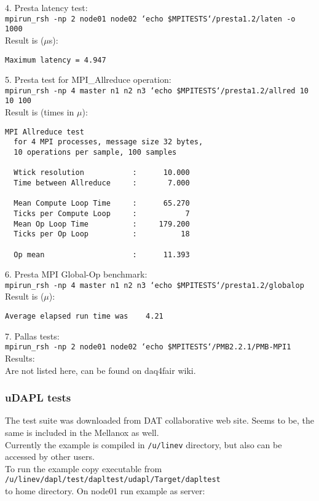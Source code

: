 4. Presta latency test:\\
{\tt mpirun\_rsh -np 2 node01 node02 `echo \$MPITESTS`/presta1.2/laten -o 1000}\\
Result is ($\mu$s):
\begin{verbatim}
Maximum latency = 4.947 
\end{verbatim}

5. Presta test for MPI\_Allreduce operation:\\
{\tt mpirun\_rsh -np 4 master n1 n2 n3 `echo \$MPITESTS`/presta1.2/allred 10 10 100}\\
Result is (times in $\mu$):
\begin{verbatim}
MPI Allreduce test
  for 4 MPI processes, message size 32 bytes, 
  10 operations per sample, 100 samples

  Wtick resolution           :      10.000
  Time between Allreduce     :       7.000

  Mean Compute Loop Time     :      65.270
  Ticks per Compute Loop     :           7
  Mean Op Loop Time          :     179.200
  Ticks per Op Loop          :          18

  Op mean                    :      11.393
\end{verbatim}

6. Presta MPI Global-Op benchmark:\\
{\tt mpirun\_rsh -np 4 master n1 n2 n3 `echo \$MPITESTS`/presta1.2/globalop}\\
Result is ($\mu$):
\begin{verbatim}
Average elapsed run time was    4.21
\end{verbatim}

7. Pallas tests:\\
{\tt mpirun\_rsh -np 2 node01 node02 `echo \$MPITESTS`/PMB2.2.1/PMB-MPI1}\\
Results:\\
Are not listed here, can be found on daq4fair wiki.

\subsubsection{uDAPL tests}

The test suite was downloaded from DAT collaborative web site. 
Seems to be, the same is included in the Mellanox as well.\\
Currently the example is compiled in {\tt /u/linev} directory, but also can be accessed by other users.\\
To run the example copy executable from \\
{\tt /u/linev/dapl/test/dapltest/udapl/Target/dapltest}\\
 to home directory. On node01 run example as server:

